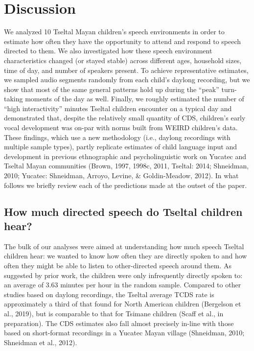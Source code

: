 \documentclass[floatsintext,man]{apa6}
\theoremstyle{definition}
\theoremstyle{definition}
\theoremstyle{definition}
\theoremstyle{remark}
\begin{document}
\section{Discussion}\label{disc}

We analyzed 10 Tseltal Mayan children's speech environments in order to
estimate how often they have the opportunity to attend and respond to
speech directed to them. We also investigated how these speech
environment characteristics changed (or stayed stable) across different
ages, household sizes, time of day, and number of speakers present. To
achieve representative estimates, we sampled audio segments randomly
from each child's daylong recording, but we show that most of the same
general patterns hold up during the \enquote{peak} turn-taking moments
of the day as well. Finally, we roughly estimated the number of
\enquote{high interactivity} minutes Tseltal children encounter on a
typical day and demonstrated that, despite the relatively small quantity
of CDS, children's early vocal development was on-par with norms built
from WEIRD children's data. These findings, which use a new methodology
(i.e., daylong recordings with multiple sample types), partly replicate
estimates of child language input and development in previous
ethnographic and psycholinguistic work on Yucatec and Tseltal Mayan
communities (Brown, 1997, 1998c, 2011, Tseltal: 2014; Shneidman, 2010;
Yucatec: Shneidman, Arroyo, Levine, \& Goldin-Meadow, 2012). In what
follows we briefly review each of the predictions made at the outset of
the paper.

\subsection{How much directed speech do Tseltal children
hear?}\label{how-much-directed-speech-do-tseltal-children-hear}

The bulk of our analyses were aimed at understanding how much speech
Tseltal children hear: we wanted to know how often they are directly
spoken to and how often they might be able to listen to other-directed
speech around them. As suggested by prior work, the children were only
infrequently directly spoken to: an average of 3.63 minutes per hour in
the random sample. Compared to other studies based on daylong
recordings, the Tseltal average TCDS rate is approximately a third of
that found for North American children (Bergelson et al., 2019), but is
comparable to that for Tsimane children (Scaff et al., in preparation).
The CDS estimates also fall almost precisely in-line with those based on
short-format recordings in a Yucatec Mayan village (Shneidman, 2010;
Shneidman et al., 2012).
\end{document}
